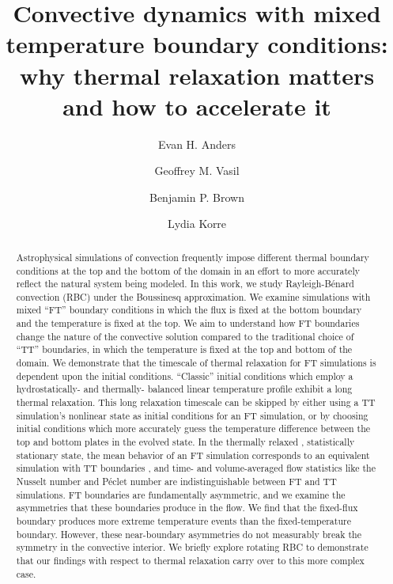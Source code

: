 \documentclass[aps, pre, onecolumn, nofootinbib, notitlepage, groupedaddress, amsfonts, amssymb, amsmath, longbibliography, superscriptaddress]{revtex4-1}
\newcommand{\RB}{Rayleigh-B\'{e}nard }
\newcommand{\ea}[1]{{\color{red} #1}}
\begin{document}
\author{Evan H. Anders}
\author{Geoffrey M. Vasil}
\author{Benjamin P. Brown}
\author{Lydia Korre}

\title{Convective dynamics with mixed temperature boundary conditions: \\
why thermal relaxation matters and how to accelerate it}

\begin{abstract}
Astrophysical simulations of convection frequently impose different thermal boundary conditions at the top and the bottom of the domain in an effort to more accurately reflect the natural system being modeled.
In this work, we study \RB convection (RBC) \ea{under the Boussinesq approximation}.
\ea{We examine simulations with mixed ``FT'' boundary conditions in which the flux is fixed at the bottom boundary and the temperature is fixed at the top.}
We aim to understand how FT boundaries change the nature of the convective solution compared to the traditional choice of \ea{``TT'' boundaries, in which the temperature is fixed} at the top and bottom of the domain.
\ea{We demonstrate that the timescale of thermal relaxation for FT simulations is dependent upon the initial conditions.
``Classic'' initial conditions which employ a hydrostatically- and thermally- balanced linear temperature profile exhibit a long thermal relaxation.
This long relaxation timescale can be skipped by either using a TT simulation's nonlinear state as initial conditions for an FT simulation, or by choosing initial conditions which more accurately guess the temperature difference between the top and bottom plates in the evolved state.}
In the \ea{thermally} relaxed\ea{, statistically stationary} state, the mean behavior of an FT simulation corresponds to an equivalent simulation with TT boundaries\ea{, and time- and volume-averaged flow statistics like the Nusselt number and P\'{e}clet number are indistinguishable between FT and TT simulations}.
\ea{FT boundaries are fundamentally asymmetric, and we examine the asymmetries that these boundaries produce in the flow.
We find that the fixed-flux boundary produces more extreme temperature events than the fixed-temperature boundary.
However, these near-boundary asymmetries do not measurably break the symmetry in the convective interior.
We briefly explore rotating RBC to demonstrate that our findings with respect to thermal relaxation carry over to this more complex case.}
\end{abstract}
\maketitle
\end{document}
